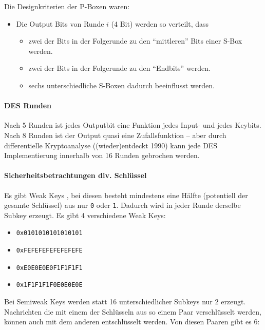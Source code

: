 Die Designkriterien der P-Boxen waren:

\begin{itemize}
    \item Die Output Bits von Runde $i$ (4 Bit) werden so verteilt, dass
    \begin{itemize}
        \item zwei der Bits in der Folgerunde zu den ``mittleren'' Bits einer S-Box werden. 
        \item zwei der Bits in der Folgerunde zu den ``Endbits'' werden. 
        \item sechs unterschiedliche S-Boxen dadurch beeinflusst werden.
    \end{itemize}
\end{itemize}

\paragraph{DES Runden}

Nach 5 Runden ist jedes Outputbit eine Funktion jedes Input- und jedes Keybits. \\
Nach 8 Runden ist der Output quasi eine Zufallsfunktion -- aber durch differentielle Kryptoanalyse ((wieder)entdeckt 1990)
kann jede DES Implementierung innerhalb von 16 Runden gebrochen werden. 

\paragraph{Sicherheitsbetrachtungen div. Schlüssel}

Es gibt Weak Keys , bei diesen besteht mindestens eine Hälfte (potentiell der gesamte Schlüssel) aus nur \verb|0| oder \verb|1|. Dadurch wird in jeder 
Runde derselbe Subkey erzeugt. Es gibt 4 verschiedene Weak Keys:

\begin{itemize}
    \item \verb|0x0101010101010101|
    \item \verb|0xFEFEFEFEFEFEFEFE|
    \item \verb|0xE0E0E0E0F1F1F1F1|
    \item \verb|0x1F1F1F1F0E0E0E0E|
\end{itemize}

Bei Semiweak Keys  werden statt 16 unterschiedlicher Subkeys nur 2 erzeugt. Nachrichten die mit einem der Schlüsseln aus so einem Paar verschlüsselt 
werden, können auch mit dem anderen entschlüsselt werden. Von diesen Paaren gibt es 6:

